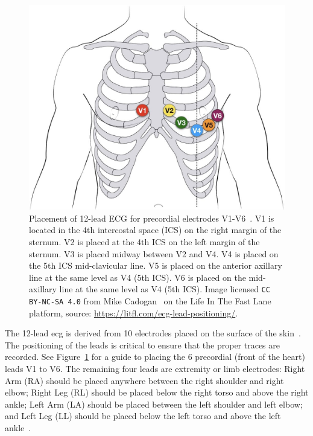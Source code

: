 \documentclass[\main/thesis.tex]{subfiles}
\begin{document}
\begin{figure}[ht]
    \centering
    \includegraphics[width=12cm]{figure/12-lead-ECG-lead-placement.jpg}
    \caption[Placement of 12-lead ECG for precordial electrodes V1-V6.]{Placement of 12-lead ECG for precordial electrodes V1-V6~\cite{ecg-lead-positioning}. V1 is located in the 4th intercostal space (ICS) on the right margin of the sternum. V2 is placed at the 4th ICS on the left margin of the sternum. V3 is placed midway between V2 and V4. V4 is placed on the 5th ICS mid-clavicular line. V5 is placed on the anterior axillary line at the same level as V4 (5th ICS). V6 is placed on the mid-axillary line at the same level as V4 (5th ICS).
    Image licensed \texttt{CC BY-NC-SA 4.0} from Mike Cadogan~\cite{ecg-lead-positioning} on the Life In The Fast Lane platform, source: \url{https://litfl.com/ecg-lead-positioning/}.}
    \label{fig:12-lead-ecg-placement}
\end{figure}

The 12-lead \gls{ecg} is derived from 10 electrodes placed on the surface of the skin~\cite{ecg-lead-positioning}.
The positioning of the leads is critical to ensure that the proper traces are recorded.
See Figure~\ref{fig:12-lead-ecg-placement} for a guide to placing the 6 precordial (front of the heart) leads V1 to V6.
The remaining four leads are extremity or limb electrodes: Right Arm (RA) should be placed anywhere between the right shoulder and right elbow; Right Leg (RL) should be placed below the right torso and above the right ankle; Left Arm (LA) should be placed between the left shoulder and left elbow; and Left Leg (LL) should be placed below the left torso and above the left ankle~\cite{ecg-lead-positioning}.
\end{document}
